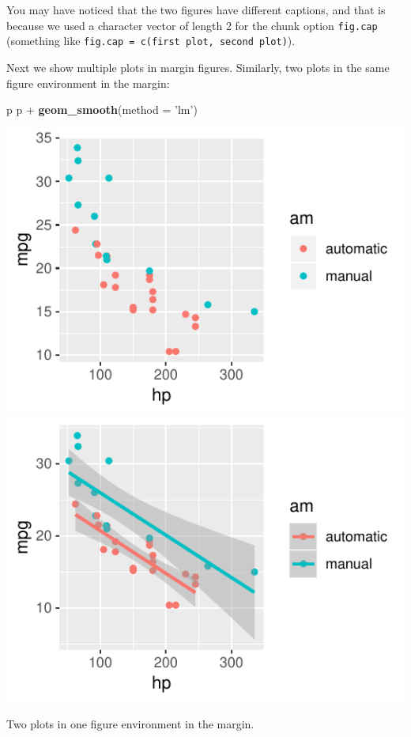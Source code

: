 \documentclass[]{tufte-handout}
\newenvironment{Shaded}{}{}
\newcommand{\KeywordTok}[1]{\textcolor[rgb]{0.00,0.44,0.13}{\textbf{#1}}}
\newcommand{\DataTypeTok}[1]{\textcolor[rgb]{0.56,0.13,0.00}{#1}}
\newcommand{\StringTok}[1]{\textcolor[rgb]{0.25,0.44,0.63}{#1}}
\newcommand{\OperatorTok}[1]{\textcolor[rgb]{0.40,0.40,0.40}{#1}}
\newcommand{\NormalTok}[1]{#1}
\begin{document}
You may have noticed that the two figures have different captions, and
that is because we used a character vector of length 2 for the chunk
option \texttt{fig.cap} (something like
\texttt{fig.cap\ =\ c(\textquotesingle{}first\ plot\textquotesingle{},\ \textquotesingle{}second\ plot\textquotesingle{})}).

Next we show multiple plots in margin figures. Similarly, two plots in
the same figure environment in the margin:

\begin{Shaded}
\begin{Highlighting}[]
\NormalTok{p}
\NormalTok{p }\OperatorTok{+}\StringTok{ }\KeywordTok{geom_smooth}\NormalTok{(}\DataTypeTok{method =} \StringTok{'lm'}\NormalTok{)}
\end{Highlighting}
\end{Shaded}

\begin{marginfigure}
\includegraphics{TufteExample_files/figure-latex/fig-margin-together-1} \includegraphics{TufteExample_files/figure-latex/fig-margin-together-2} \caption[Two plots in one figure environment in the margin]{Two plots in one figure environment in the margin.}\label{fig:fig-margin-together}
\end{marginfigure}
\end{document}
